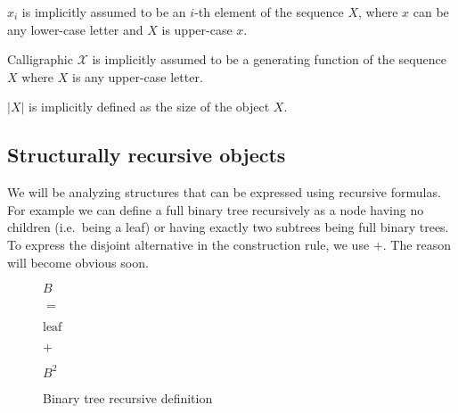 \documentclass[final]{article}
\theoremstyle{definition}
\theoremstyle{remark}
\newcommand{\gf}[1]{\ensuremath{\mathcal{#1}}}
\newcommand{\size}[1]{\ensuremath{\left|#1\right|}}
\begin{document}
\(x_i\) is implicitly assumed to be an \(i\)-th element of the sequence \(X\), where \(x\) can be any lower-case letter and \(X\) is upper-case \(x\).

Calligraphic \(\gf{X}\) is implicitly assumed to be a generating function of the sequence \(X\) where \(X\) is any upper-case letter.

\(\size{X}\) is implicitly defined as the size of the object \(X\).

\subsection{Structurally recursive objects}%
\label{sub:structurally_recursive_objects}

We will be analyzing structures that can be expressed using recursive formulas. For example we can define a full binary tree recursively as a node having no children (i.e.\ being a leaf) or having exactly two subtrees being full binary trees. To express the disjoint alternative in the construction rule, we use \(+\). The reason will become obvious soon.

\begin{figure}[H]
    \begin{center}
        \begin{minipage}[t]{.2\textwidth}
            \begin{center}
                \(B\)\\
            \end{center}
        \end{minipage}%
        \begin{minipage}[t]{.05\textwidth}
            \begin{center}
                \(=\)\\
            \end{center}
        \end{minipage}%
        \begin{minipage}[t]{.2\textwidth}
            \begin{center}
                \(\text{leaf}\)\\
            \end{center}
        \end{minipage}%
        \begin{minipage}[t]{.05\textwidth}
            \begin{center}
                \(+\)\\
            \end{center}
        \end{minipage}%
        \begin{minipage}[t]{.2\textwidth}
            \begin{center}
                \(B^2\)\\
            \end{center}
        \end{minipage}%
    \end{center}
    \caption{Binary tree recursive definition}
    \label{fig:binary_recursion}
\end{figure}
\end{document}
